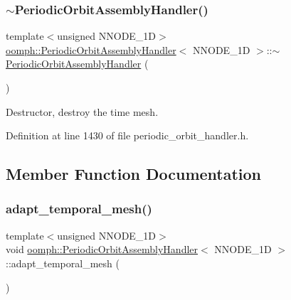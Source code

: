 \subsubsection{\texorpdfstring{$\sim$\+Periodic\+Orbit\+Assembly\+Handler()}{~PeriodicOrbitAssemblyHandler()}}
{\footnotesize\ttfamily template$<$unsigned N\+N\+O\+D\+E\+\_\+1D$>$ \\
\hyperlink{classoomph_1_1PeriodicOrbitAssemblyHandler}{oomph\+::\+Periodic\+Orbit\+Assembly\+Handler}$<$ N\+N\+O\+D\+E\+\_\+1D $>$\+::$\sim$\hyperlink{classoomph_1_1PeriodicOrbitAssemblyHandler}{Periodic\+Orbit\+Assembly\+Handler} (\begin{DoxyParamCaption}{ }\end{DoxyParamCaption})\hspace{0.3cm}{\ttfamily [inline]}}



Destructor, destroy the time mesh. 



Definition at line 1430 of file periodic\+\_\+orbit\+\_\+handler.\+h.



\subsection{Member Function Documentation}
\mbox{\label{classoomph_1_1PeriodicOrbitAssemblyHandler_a358d1749faa8ac7dd0de87340d878088}} 
\subsubsection{\texorpdfstring{adapt\+\_\+temporal\+\_\+mesh()}{adapt\_temporal\_mesh()}}
{\footnotesize\ttfamily template$<$unsigned N\+N\+O\+D\+E\+\_\+1D$>$ \\
void \hyperlink{classoomph_1_1PeriodicOrbitAssemblyHandler}{oomph\+::\+Periodic\+Orbit\+Assembly\+Handler}$<$ N\+N\+O\+D\+E\+\_\+1D $>$\+::adapt\+\_\+temporal\+\_\+mesh (\begin{DoxyParamCaption}{ }\end{DoxyParamCaption})\hspace{0.3cm}{\ttfamily [inline]}}



